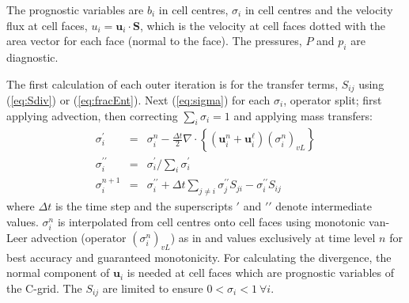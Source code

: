 \documentclass[draft]{agujournal2019}
\begin{document}
The prognostic variables are  $b_{i}$ in cell centres,  $\sigma_{i}$
in cell centres and the velocity flux at cell faces, $u_{i}=\mathbf{u}_{i}\cdot\mathbf{S}$,
which is the velocity at cell faces dotted with the area vector for
each face (normal to the face). The pressures, $P$ and $p_{i}$ are
diagnostic.

{The first calculation of each outer iteration is for the transfer terms, $S_{ij}$ using ({\protect\ref{eq:Sdiv}}) or ({\protect\ref{eq:fracEnt}}). Next}
(\ref{eq:sigma}) 
for each $\sigma_{i}$, operator split; first applying advection,
then correcting $\sum_{i}\sigma_{i}=1$ and  applying mass transfers:
\begin{eqnarray}
\sigma_{i}^{\prime} & = & \sigma_{i}^{n}-\frac{\Delta t}{2}\nabla\cdot\left\{ \left(\mathbf{u}_{i}^{n}+\mathbf{u}_{i}^{\ell}\right)\left(\sigma_{i}^{n}\right)_{vL}\right\}
\\
\sigma_{i}^{\prime\prime} & = & \sigma_{i}^{\prime}\bigg/\sum_{i}\sigma_{i}^{\prime}
\\
\sigma_{i}^{n+1} & = & \sigma_{i}^{\prime\prime}+\Delta t\sum_{j\ne i}\sigma_{j}^{\prime\prime}S_{ji}-\sigma_{i}^{\prime\prime}S_{ij}
\end{eqnarray}
where $\Delta t$ is the time step and the superscripts $\prime$
and $\prime\prime$ denote intermediate values. $\sigma_{i}^{n}$
is interpolated from cell centres onto cell faces using monotonic
van-Leer advection (operator $(\sigma_{i}^{n})_{vL}$) as in 
and values exclusively at time level $n$ for best accuracy and guaranteed
monotonicity. For calculating the divergence, the normal component
of $\mathbf{u}_{i}$ is needed at cell faces which are prognostic
variables of the C-grid. The $S_{ij}$ are limited to ensure $0<\sigma_{i}<1\ \forall i$. 
\end{document}
